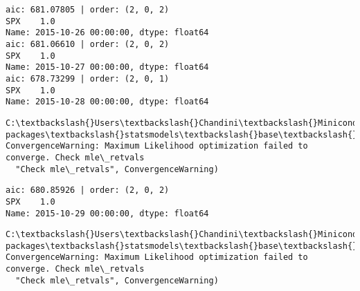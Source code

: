 \documentclass[11pt]{article}
\begin{document}
    \begin{Verbatim}[commandchars=\\\{\}]
aic: 681.07805 | order: (2, 0, 2)
SPX    1.0
Name: 2015-10-26 00:00:00, dtype: float64
aic: 681.06610 | order: (2, 0, 2)
SPX    1.0
Name: 2015-10-27 00:00:00, dtype: float64
aic: 678.73299 | order: (2, 0, 1)
SPX    1.0
Name: 2015-10-28 00:00:00, dtype: float64

    \end{Verbatim}

    \begin{Verbatim}[commandchars=\\\{\}]
C:\textbackslash{}Users\textbackslash{}Chandini\textbackslash{}Miniconda3\textbackslash{}envs\textbackslash{}auquan\textbackslash{}lib\textbackslash{}site-packages\textbackslash{}statsmodels\textbackslash{}base\textbackslash{}model.py:496: ConvergenceWarning: Maximum Likelihood optimization failed to converge. Check mle\_retvals
  "Check mle\_retvals", ConvergenceWarning)

    \end{Verbatim}

    \begin{Verbatim}[commandchars=\\\{\}]
aic: 680.85926 | order: (2, 0, 2)
SPX    1.0
Name: 2015-10-29 00:00:00, dtype: float64

    \end{Verbatim}

    \begin{Verbatim}[commandchars=\\\{\}]
C:\textbackslash{}Users\textbackslash{}Chandini\textbackslash{}Miniconda3\textbackslash{}envs\textbackslash{}auquan\textbackslash{}lib\textbackslash{}site-packages\textbackslash{}statsmodels\textbackslash{}base\textbackslash{}model.py:496: ConvergenceWarning: Maximum Likelihood optimization failed to converge. Check mle\_retvals
  "Check mle\_retvals", ConvergenceWarning)

    \end{Verbatim}
\end{document}
